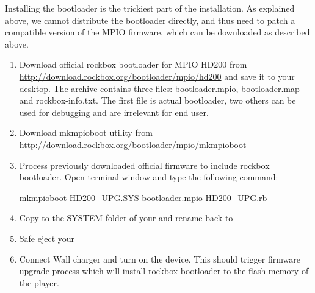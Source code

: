 
  Installing the bootloader is the trickiest part of the installation.
  As explained above, we cannot distribute the bootloader directly, and
  thus need to patch a compatible version of the MPIO firmware, which
  can be downloaded as described above.


\begin{enumerate}
   \item Download official rockbox bootloader for MPIO HD200 from
   \url {http://download.rockbox.org/bootloader/mpio/hd200}
   and save it to your desktop. The archive contains three files: bootloader.mpio, 
   bootloader.map and rockbox-info.txt. The first file is actual bootloader, two
   others can be used for debugging and are irrelevant for end user.
   \item Download mkmpioboot utility from \url{http://download.rockbox.org/bootloader/mpio/mkmpioboot}
   \item Process previously downloaded official firmware to include rockbox bootloader.
   Open terminal window and type the following command:
     \begin{code}
       mkmpioboot HD200_UPG.SYS bootloader.mpio HD200_UPG.rb
     \end{code}
   \item Copy  to the SYSTEM folder of your \dap{} and rename back to
   \item Safe eject your \dap{}
   \item Connect Wall charger and turn on the device. This should trigger firmware
   upgrade process which will install rockbox bootloader to the flash memory of the
   player.
\end{enumerate}

